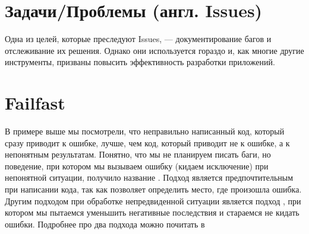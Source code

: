 \documentclass[letterpaper,10pt,russian]{sphinxmanual}
\begin{document}
\begin{sphinxVerbatim}[commandchars=\\\{\}]
 

      

      
          

   
      
\end{sphinxVerbatim}


\section{Задачи/Проблемы (англ. Issues)}
\label{\detokenize{educational_materials/terms/content:issues}}
\sphinxAtStartPar
Одна из целей, которые преследуют Issues, — документирование багов и отслеживание их решения. Однако они используется гораздо  и, как многие другие инструменты, призваны повысить эффективность разработки приложений.


\section{Fail\sphinxhyphen{}fast}
\label{\detokenize{educational_materials/terms/content:fail-fast}}
\sphinxAtStartPar
В примере выше мы посмотрели, что неправильно написанный код, который сразу приводит к ошибке, лучше, чем код, который приводит не к ошибке, а к непонятным результатам. Понятно, что мы не планируем писать баги, но поведение, при котором мы вызываем ошибку (кидаем исключение) при непонятной ситуации, получило название . Подход  является предпочтительным при написании кода, так как позволяет определить место, где произошла ошибка. Другим подходом при обработке непредвиденной ситуации является подход , при котором мы пытаемся уменьшить негативные последствия и стараемся не кидать ошибки. Подробнее про два подхода можно почитать в 
\end{document}
